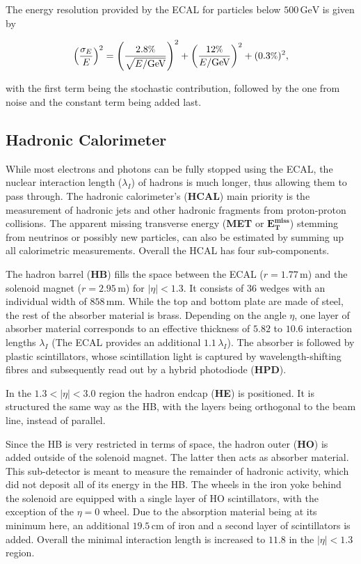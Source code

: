 The energy resolution provided by the ECAL for particles below $500\,\text{GeV}$ is given by

\begin{equation}
  \label{eq:ecalreso}
  \left( \frac{ \sigma_E}{E} \right)^2 = \left( \frac{2.8\pct}{\sqrt{E/\text{GeV}}} \right)^2 + \left( \frac{12\pct}{E/\text{GeV}} \right)^2 + (0.3\pct)^2,
\end{equation}

\noindent with the first term being the stochastic contribution, followed by the one from noise and the constant term being added last.


\subsection{Hadronic Calorimeter}

While most electrons and photons can be fully stopped using the ECAL, the nuclear interaction length ($\lambda_I$) of hadrons is much longer, thus allowing them to pass through. The hadronic calorimeter's (\textbf{HCAL}) main priority is the measurement of hadronic jets and other hadronic fragments from proton-proton collisions. The apparent missing transverse energy (\textbf{MET} or $\mathbf{E^{\text{miss}}_{\text{T}}}$) stemming from neutrinos or possibly new particles, can also be estimated by summing up all calorimetric measurements. Overall the HCAL has four sub-components.

The hadron barrel (\textbf{HB}) fills the space between the ECAL ($r = 1.77\,\text{m}$) and the solenoid magnet ($r = 2.95\,\text{m}$) for $|\eta| < 1.3$. It consists of 36 wedges with an individual width of $858\,\text{mm}$. While the top and bottom plate are made of steel, the rest of the absorber material is brass. Depending on the angle $\eta$, one layer of absorber material corresponds to an effective thickness of $5.82$ to $10.6$ interaction lengths $\lambda_I$ (The ECAL provides an additional $1.1\,\lambda_I$). The absorber is followed by plastic scintillators, whose scintillation light is captured by wavelength-shifting fibres and subsequently read out by a hybrid photodiode (\textbf{HPD}).

In the $1.3 < |\eta| < 3.0$ region the hadron endcap (\textbf{HE}) is positioned. It is structured the same way as the HB, with the layers being orthogonal to the beam line, instead of parallel.

Since the HB is very restricted in terms of space, the hadron outer (\textbf{HO}) is added outside of the solenoid magnet. The latter then acts as absorber material. This sub-detector is meant to measure the remainder of hadronic activity, which did not deposit all of its energy in the HB. The wheels in the iron yoke behind the solenoid are equipped with a single layer of HO scintillators, with the exception of the $\eta = 0$ wheel. Due to the absorption material being at its minimum here, an additional $19.5\,\text{cm}$ of iron and a second layer of scintillators is added. Overall the minimal interaction length is increased to $11.8$ in the $|\eta| < 1.3$ region.

